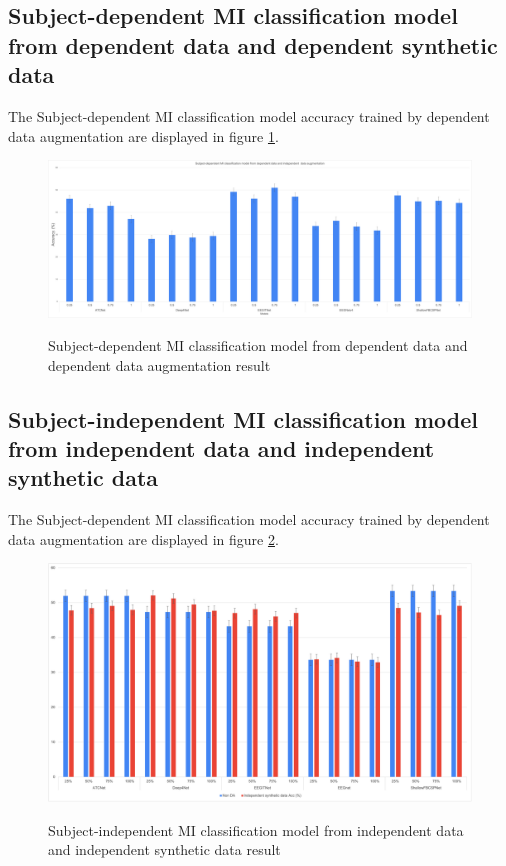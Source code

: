 \subsection{Subject-dependent MI classification model from dependent data and dependent synthetic data}

The Subject-dependent MI classification model accuracy trained by dependent data augmentation are displayed in figure \ref{fig:Subject-dependent MI classification model from dependent and independent data augmentation result}.
\begin{figure}[ht]
  \centering
  \caption[system diagram]{Subject-dependent MI classification model from dependent data and dependent data augmentation result}
  \includegraphics[width=1.1\textwidth]{fig/dependent_data_and_independent_data_augmentation.png}
  \label{fig:Subject-dependent MI classification model from dependent and independent data augmentation result}
\end{figure}

\subsection{Subject-independent MI classification model from independent data and independent synthetic data}

The Subject-dependent MI classification model accuracy trained by dependent data augmentation are displayed in figure \ref{fig:independent synthetic data}.

\begin{figure}[ht]
  \centering
  \caption[Subject-independent MI classification model from independent data and independent synthetic data result]{Subject-independent MI classification model from independent data and independent synthetic data result}
  \includegraphics[width=1.1\textwidth]{fig/independent synthetic data.png.png}
  \label{fig:independent synthetic data}
\end{figure}


